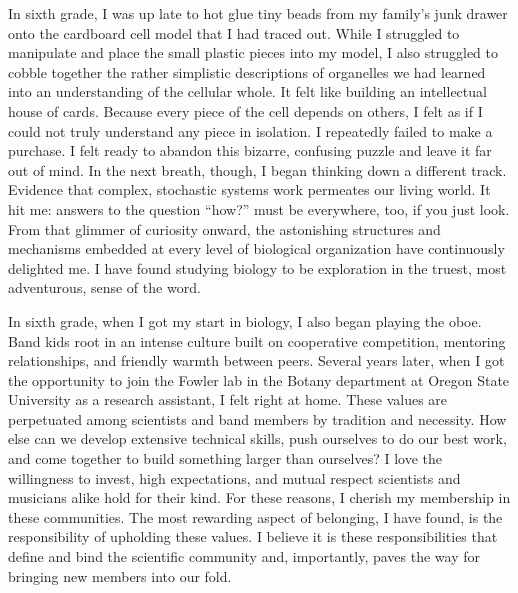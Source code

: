 
In sixth grade, I was up late to hot glue tiny beads from my family's junk drawer onto the cardboard cell model that I had traced out.
While I struggled to manipulate and place the small plastic pieces into my model, I also struggled to cobble together the rather simplistic descriptions of organelles we had learned into an understanding of the cellular whole.
It felt like building an intellectual house of cards.
Because every piece of the cell depends on others, I felt as if I could not truly understand any piece in isolation.
I repeatedly failed to make a purchase.
I felt ready to abandon this bizarre, confusing puzzle and leave it far out of mind.
In the next breath, though, I began thinking down a different track.
Evidence that complex, stochastic systems work permeates our living world.
It hit me: answers to the question ``how?'' must be everywhere, too, if you just look.
From that glimmer of curiosity onward, the astonishing structures and mechanisms embedded at every level of biological organization have continuously delighted me.
I have found studying biology to be exploration in the truest, most adventurous, sense of the word.

In sixth grade, when I got my start in biology, I also began playing the oboe.
Band kids root in an intense culture built on cooperative competition, mentoring relationships, and friendly warmth between peers.
Several years later, when I got the opportunity to join the Fowler lab in the Botany department at Oregon State University as a research assistant, I felt right at home.
These values are perpetuated among scientists and band members by tradition and necessity.
How else can we develop extensive technical skills, push ourselves to do our best work, and come together to build something larger than ourselves?
I love the willingness to invest, high expectations, and mutual respect scientists and musicians alike hold for their kind.
For these reasons, I cherish my membership in these communities.
The most rewarding aspect of belonging, I have found, is the responsibility of upholding these values.
I believe it is these responsibilities that define and bind the scientific community and, importantly, paves the way for bringing new members into our fold.
